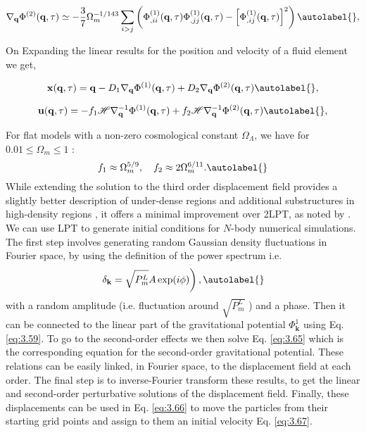 \begin{equation}
    \nabla_{\mathbf{q}} \Phi^{(2)}(\mathbf{q}, \tau) \simeq-\frac{3}{7} \Omega_{m}^{-1 / 143} \sum_{i>j}\left(\Phi_{, i i}^{(1)}(\mathbf{q}, \tau) \Phi_{, j j}^{(1)}(\mathbf{q}, \tau)-\left[\Phi_{, i j}^{(1)}(\mathbf{q}, \tau)\right]^{2}\right) \autolabel{},
\end{equation}


On Expanding the linear results for the position and velocity of a fluid element we get,


\begin{equation}
    \mathbf{x}(\mathbf{q}, \tau)=\mathbf{q}-D_{1} \nabla_{\mathbf{q}} \Phi^{(1)}(\mathbf{q}, \tau)+D_{2} \nabla_{\mathbf{q}} \Phi^{(2)}(\mathbf{q}, \tau) \autolabel{},
\end{equation}



\begin{equation}
    \mathbf{u}(\mathbf{q}, \tau)=-f_{1} \mathcal{H} \nabla_{\mathbf{q}}^{-1} \Phi^{(1)}(\mathbf{q}, \tau)+f_{2} \mathcal{H} \nabla_{\mathbf{q}}^{-1} \Phi^{(2)}(\mathbf{q}, \tau) \autolabel{},
\end{equation}

For flat models with a non-zero cosmological constant $\Omega_\Lambda$, we have for $0.01 \leq \Omega_m \leq 1$ \cite{bouchet1996introductory}:
\[
f_1 \approx \Omega_m^{5/9}, \quad f_2 \approx 2 \Omega_m^{6/11}.\autolabel{}
\]
While extending the solution to the third order displacement field provides a slightly better description of under-dense regions and additional substructures in high-density regions \cite{bouchet1996introductory}, it offers a minimal improvement over 2LPT, as noted by \cite{buchert1994A&A...288..349B, Melot1995A&A...294..345M}.\\

We can use LPT to generate initial conditions for $N$-body numerical simulations. The first step involves generating random Gaussian density fluctuations in Fourier space, by using the definition of the power spectrum i.e. 
\[
\left.\delta_{\mathbf{k}}=\sqrt{P_{m}^{L}} A \exp (i \phi)\right), \autolabel{}
\] 
with a random amplitude (i.e. fluctuation around $\sqrt{P_{m}^{L}}$ ) and a phase. Then it can be connected to the linear part of the gravitational potential $\Phi_{\mathbf{k}}^{1}$ using Eq. \eqref{eq:3.59}. To go to the second-order effects we then solve Eq. \eqref{eq:3.65} which is the corresponding equation for the second-order gravitational potential. These relations can be easily linked, in Fourier space, to the displacement field at each order. The final step is to inverse-Fourier transform these results, to get the linear and second-order perturbative solutions of the displacement field. Finally, these displacements can be used in Eq. \eqref{eq:3.66}  to move the particles from their starting grid points and assign to them an initial velocity Eq. \eqref{eq:3.67}.

